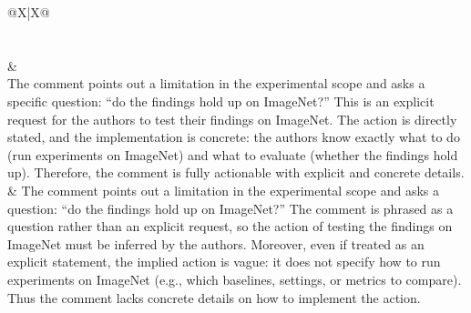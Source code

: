\begin{table}[t]
\centering
\normalsize
\setlength{\tabcolsep}{7pt}
\renewcommand{\arraystretch}{1.3}
\begin{tabularx}{\textwidth}{@{}X|X@{}}
\toprule
{} \\
\midrule
{} \\
\midrule
{} \\
\midrule
{}
 &
 \\
The comment points out a limitation in the experimental scope and asks
\textcolor{red!70!black}{a specific question}: ``do the findings hold up
on ImageNet?'' \textcolor{red!70!black}{This is an explicit request for
the authors to test their findings on ImageNet. The action is directly
stated, and the implementation is concrete: the authors know exactly what
to do (run experiments on ImageNet) and what to evaluate (whether the
findings hold up). Therefore, the comment is fully actionable with
explicit and concrete details.} &
The comment points out a limitation in the experimental scope and asks
\textcolor{blue!70!black}{a question}: ``do the findings hold up on
ImageNet?'' \textcolor{blue!70!black}{The comment is phrased as a question
rather than an explicit request, so the action of testing the findings on
ImageNet must be inferred by the authors. Moreover, even if treated as an
explicit statement, the implied action is vague: it does not specify how
to run experiments on ImageNet (e.g., which baselines, settings, or
metrics to compare). Thus the comment lacks concrete details on how to
implement the action.} \\

\end{tabularx}
\end{table}
